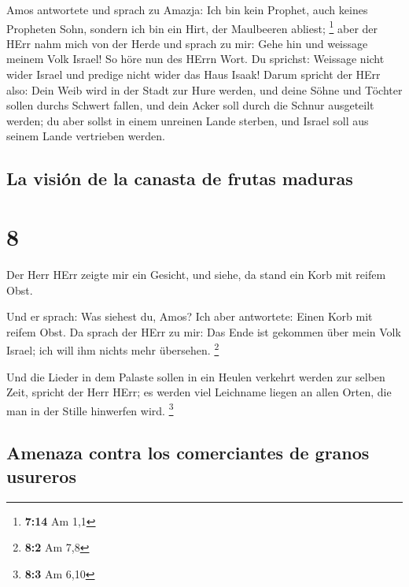  Amos antwortete und sprach zu Amazja: Ich bin kein
Prophet, auch keines Propheten Sohn, sondern ich bin ein Hirt, der
Maulbeeren abliest; \footnote{\textbf{7:14} Am 1,1}  aber
der HErr nahm mich von der Herde und sprach zu mir: Gehe hin und
weissage meinem Volk Israel!  So höre nun des HErrn Wort.
Du sprichst: Weissage nicht wider Israel und predige nicht wider das
Haus Isaak!  Darum spricht der HErr also: Dein Weib wird
in der Stadt zur Hure werden, und deine Söhne und Töchter sollen durchs
Schwert fallen, und dein Acker soll durch die Schnur ausgeteilt werden;
du aber sollst in einem unreinen Lande sterben, und Israel soll aus
seinem Lande vertrieben werden.

\hypertarget{la-visiuxf3n-de-la-canasta-de-frutas-maduras}{%
\subsection{La visión de la canasta de frutas
maduras}\label{la-visiuxf3n-de-la-canasta-de-frutas-maduras}}

\hypertarget{section-7}{%
\section{8}\label{section-7}}

 Der Herr HErr zeigte mir ein Gesicht, und siehe, da stand
ein Korb mit reifem Obst.

 Und er sprach: Was siehest du, Amos? Ich aber antwortete:
Einen Korb mit reifem Obst. Da sprach der HErr zu mir: Das Ende ist
gekommen über mein Volk Israel; ich will ihm nichts mehr übersehen.
\footnote{\textbf{8:2} Am 7,8}

 Und die Lieder in dem Palaste sollen in ein Heulen
verkehrt werden zur selben Zeit, spricht der Herr HErr; es werden viel
Leichname liegen an allen Orten, die man in der Stille hinwerfen wird.
\footnote{\textbf{8:3} Am 6,10}

\hypertarget{amenaza-contra-los-comerciantes-de-granos-usureros}{%
\subsection{Amenaza contra los comerciantes de granos
usureros}\label{amenaza-contra-los-comerciantes-de-granos-usureros}}

